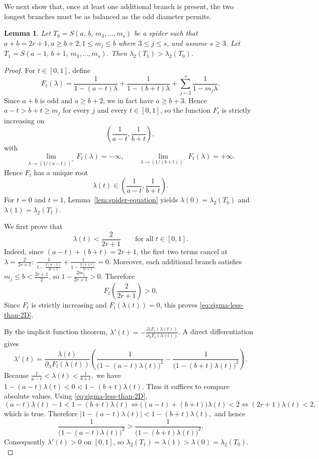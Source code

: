 \documentclass[11pt]{article}
\newtheorem{lemma}[theorem]{Lemma}
\theoremstyle{remark}
\begin{document}
We next show that, once at least one additional branch is present, the two longest branches must be as
balanced as the odd diameter permits.

\begin{lemma}\label{lem:balance-main}
Let
$T_0=S(a,\,b,\,m_3,\dots,m_s)$
be a spider such that
$a+b=2r+1, a\ge b+2, 1\le m_j\le b$ where $3\le j\le s$,
and assume $s\ge 3$.
Let
$T_1=S(a-1,\,b+1,\,m_3,\dots,m_s).$
Then
$\lambda_2(T_1)>\lambda_2(T_0).$
\end{lemma}

\begin{proof}
For $t\in[0,1]$, define
$$
F_t(\lambda)=
\frac1{1-(a-t)\lambda}
+
\frac1{1-(b+t)\lambda}
+
\sum_{j=3}^s \frac1{1-m_j\lambda}.
$$
Since $a+b$ is odd and $a\ge b+2$, we in fact have $a\ge b+3$.
Hence $a-t>b+t\ge m_j$ for every $j$ and every $t\in[0,1]$, so the function $F_t$ is strictly increasing on
$$
\left(\frac1{a-t},\frac1{b+t}\right),
$$
with
$$
\lim_{\lambda\to (1/(a-t))^+}F_t(\lambda)=-\infty,
\qquad
\lim_{\lambda\to (1/(b+t))^-}F_t(\lambda)=+\infty.
$$
Hence $F_t$ has a unique root
$$
\lambda(t)\in\left(\frac1{a-t},\frac1{b+t}\right).
$$
For $t=0$ and $t=1$, Lemma~\ref{lem:spider-equation} yields
$\lambda(0)=\lambda_2(T_0)$ and $\lambda(1)=\lambda_2(T_1).$

We first prove that
\begin{equation}\label{eq:sigma-less-than-2D}
\lambda(t)<\frac{2}{2r+1}
\qquad\text{for all }t\in[0,1].
\end{equation}
Indeed, since $(a-t)+(b+t)=2r+1$, the first two terms cancel at $\lambda=\frac{2}{2r+1}$:
$\frac1{1-\frac{2(a-t)}{2r+1}} + \frac1{1-\frac{2(b+t)}{2r+1}} =0.$
Moreover, each additional branch satisfies $m_j\le b<\frac{2r+1}{2}$, so
$1-\frac{2m_j}{2r+1}>0.$
Therefore
$$
F_t\!\left(\frac{2}{2r+1}\right)>0.
$$
Since $F_t$ is strictly increasing and $F_t(\lambda(t))=0$, this proves \eqref{eq:sigma-less-than-2D}.

By the implicit function theorem,
$\lambda'(t)=-\frac{\partial_t F_t(\lambda(t))}{\partial_\lambda F_t(\lambda(t))}.$
A direct differentiation gives
$$
\lambda'(t)
=
\frac{\lambda(t)}{\partial_\lambda F_t(\lambda(t))}
\left(
\frac{1}{\bigl(1-(a-t)\lambda(t)\bigr)^2}
-
\frac{1}{\bigl(1-(b+t)\lambda(t)\bigr)^2}
\right).
$$
Because
$\frac1{a-t}<\lambda(t)<\frac1{b+t},$
we have
$1-(a-t)\lambda(t)<0<1-(b+t)\lambda(t).$
Thus it suffices to compare absolute values. Using \eqref{eq:sigma-less-than-2D},
$$
(a-t)\lambda(t)-1
<
1-(b+t)\lambda(t)
\iff
\bigl((a-t)+(b+t)\bigr)\lambda(t)<2
\iff
(2r+1)\lambda(t)<2,
$$
which is true. Therefore
$\bigl|1-(a-t)\lambda(t)\bigr|<1-(b+t)\lambda(t),$
and hence
$$
\frac{1}{\bigl(1-(a-t)\lambda(t)\bigr)^2}
>
\frac{1}{\bigl(1-(b+t)\lambda(t)\bigr)^2}.
$$
Consequently $\lambda'(t)>0$ on $[0,1]$, so
$\lambda_2(T_1)=\lambda(1)>\lambda(0)=\lambda_2(T_0).$
\end{proof}
\end{document}
